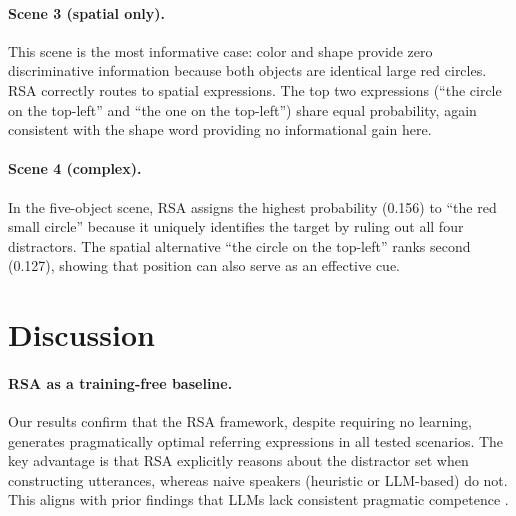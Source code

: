 \documentclass[10pt]{article}
\begin{document}
\paragraph{Scene 3 (spatial only).} This scene is the most informative case: color and shape provide zero discriminative information because both objects are identical large red circles. RSA correctly routes to spatial expressions. The top two expressions (``the circle on the top-left'' and ``the one on the top-left'') share equal probability, again consistent with the shape word providing no informational gain here.


\paragraph{Scene 4 (complex).} In the five-object scene, RSA assigns the highest probability (0.156) to ``the red small circle'' because it uniquely identifies the target by ruling out all four distractors. The spatial alternative ``the circle on the top-left'' ranks second (0.127), showing that position can also serve as an effective cue.

\section{Discussion}

\paragraph{RSA as a training-free baseline.} Our results confirm that the RSA framework, despite requiring no learning, generates pragmatically optimal referring expressions in all tested scenarios. The key advantage is that RSA explicitly reasons about the distractor set when constructing utterances, whereas naive speakers (heuristic or LLM-based) do not. This aligns with prior findings that LLMs lack consistent pragmatic competence \cite{jian2024llmpragmatic, ma2025vision}.
\end{document}
